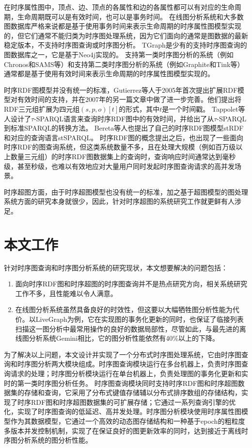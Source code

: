 在时序属性图中，顶点、边、顶点的各属性和边的各属性都可以有对应的生命周期，生命周期既可以是有效时间，也可以是事务时间。
在线图分析系统和大多数图数据库严格来说都是基于使用事务时间来表示生命周期的时序属性图模型实现的，但它们通常不能归类为时序图处理系统，因为它们面向的通常是图数据的最新稳定版本，不支持时序图查询或时序图分析。
TGraph\cite{TGraph}是少有的支持时序图查询的图数据库之一，它是基于Neo4j实现的。
支持第一类时序图分析的系统（例如Chronos\cite{Chronos}和SAMS\cite{sams}等）和支持第二类时序图分析的系统（例如Graphite\cite{Graphite}和Tink\cite{tink}等）通常都是基于使用有效时间来表示生命周期的时序属性图模型实现的。

时序RDF图模型并没有统一的标准，Gutierrez等人\cite{trdf}于2005年首次提出扩展RDF模型对有效时间的支持，并在2007年的另一篇文章\cite{trdfex}中做了进一步完善。他们提出将RDF三元组扩展为四元组$(s,p,o)[t]$的形式，其中$t$是一个时间戳。
Tappolet等人\cite{taosparql}设计了$\tau$-SPARQL语言来查询时序RDF图中的有效时间，并给出了从$\tau$-SPARQL到标准SPARQL的转换方法。
Bereta等人\cite{strdf}也提出了自己的时序RDF图模型stRDF和对应的查询语言stSPARQL。
时序RDF图的概念提出之后，也出现了一些面向时序RDF的图查询系统\cite{HyperBit}\cite{Yan2020TemporalRD}，但这类系统数量不多，且在处理大规模（例如百万级以上数量三元组）的时序RDF图数据集上的查询时，查询响应时间通常达到毫秒级，甚至秒级，也难以有效地应对大量用户同时发起时序图查询请求的高并发场景。

时序超图方面，由于时序超图模型也没有统一的标准，加之基于超图模型的图处理系统方面的研究本身就很少，因此，针对时序超图的系统研究工作就更鲜有人涉足。

\section{本文工作}
针对时序图查询和时序图分析系统的研究现状，本文想要解决的问题包括：
\begin{enumerate}
    \item 面向时序RDF图和时序超图的时序图查询并不是热点研究方向，相关系统研究工作不多，且性能难以令人满意。
    \item 在线图分析系统虽然具备良好的时效性，但这要以大幅牺牲图分析性能为代价。以LiveGraph为例，它在实现图的事务化更新的同时，也保证了临接列表扫描这一图分析中最常用操作的良好的数据局部性，尽管如此，与最先进的离线图分析系统Gemini相比，它的图分析性能依然有40\%以上的下降。
\end{enumerate}

为了解决以上问题，本文设计并实现了一个分布式时序图处理系统\sys，它由时序图查询和时序图分析两大模块组成。时序图查询模块运行在多台机器上，负责时序图查询请求的处理；时序图分析模块运行在单台机器上，负责处理图的事务化更新和实时的第一类时序图分析任务。
时序图查询模块同时支持时序RDF图和时序超图数据集的存储和查询，它采用了分布式键值存储辅以分布式排序数组的存储结构，实现了时序RDF图和时序超图数据集的可扩展存储；它通过一系列查询引擎的优化，实现了时序图查询的低延迟、高并发处理。时序图分析模块使用时序属性图模型作为其数据模型，它通过一个高效的动态图存储结构\newstore 和一种基于epoch的粗粒度多版本并发控制机制，实现了在保证良好的图更新效率的同时，达到接近于离线时序图分析系统的图分析性能。

